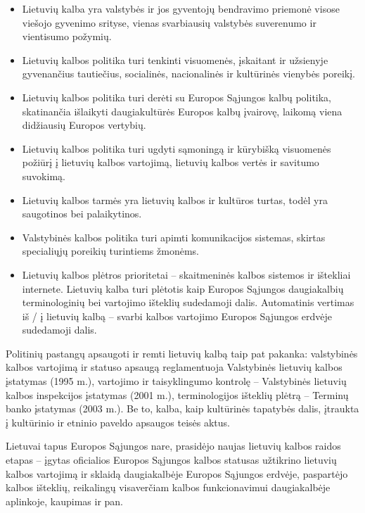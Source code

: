 \begin{multicols}{2}
  \begin{itemize}
      \item Lietuvių kalba yra valstybės ir jos gyventojų bendravimo priemonė visose viešojo gyvenimo srityse, vienas svarbiausių valstybės suverenumo ir vientisumo požymių.
      \item Lietuvių kalbos politika turi tenkinti visuomenės, įskaitant ir užsienyje gyvenančius tautiečius, socialinės, nacionalinės ir kultūrinės vienybės poreikį.
      \item Lietuvių kalbos politika turi derėti su Europos Sąjungos kalbų politika, skatinančia išlaikyti daugiakultūrės Europos kalbų įvairovę, laikomą viena didžiausių Europos vertybių.
      \item Lietuvių kalbos politika turi ugdyti sąmoningą ir kūrybišką visuomenės požiūrį į lietuvių kalbos vartojimą, lietuvių kalbos vertės ir savitumo suvokimą.
      \item Lietuvių kalbos tarmės yra lietuvių kalbos ir kultūros turtas, todėl yra saugotinos bei palaikytinos.
       \item Valstybinės kalbos politika turi apimti komunikacijos sistemas, skirtas specialiųjų poreikių turintiems žmonėms.
      \item Lietuvių kalbos plėtros prioritetai – skaitmeninės kalbos sistemos ir ištekliai internete. Lietuvių kalba turi plėtotis kaip Europos Sąjungos daugiakalbių terminologinių bei vartojimo išteklių sudedamoji dalis. Automatinis vertimas iš / į lietuvių kalbą – svarbi kalbos vartojimo Europos Sąjungos erdvėje sudedamoji dalis.
    \end{itemize}

    Politinių pastangų apsaugoti ir remti lietuvių kalbą taip pat pakanka: valstybinės kalbos vartojimą ir statuso apsaugą reglamentuoja Valstybinės lietuvių kalbos įstatymas (1995 m.), vartojimo ir taisyklingumo kontrolę – Valstybinės lietuvių kalbos inspekcijos įstatymas (2001 m.), terminologijos išteklių plėtrą – Terminų banko įstatymas (2003 m.). Be to, kalba, kaip kultūrinės tapatybės dalis, įtraukta į kultūrinio ir etninio paveldo apsaugos teisės aktus.   


 Lietuvai tapus Europos Sąjungos nare, prasidėjo naujas lietuvių kalbos raidos etapas – įgytas oficialios Europos Sąjungos kalbos statusas užtikrino lietuvių kalbos vartojimą ir sklaidą daugiakalbėje Europos Sąjungos erdvėje, paspartėjo kalbos išteklių, reikalingų visaverčiam kalbos funkcionavimui daugiakalbėje aplinkoje, kaupimas ir pan.   


\end{multicols}
